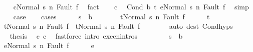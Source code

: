 \begin{isabellebody}
\ \ \isamarkupfalse%
\ {\isachardoublequoteopen}{\isasymGamma}{\isasymturnstile}{\isasymlangle}c{\isacharcomma}Normal\ s{\isasymrangle}\ {\isacharequal}n{\isasymRightarrow}\ Fault\ f{\isachardoublequoteclose}\ \isamarkupfalse%
\ fact\isanewline
\ \ \isamarkupfalse%
\ c\ \isamarkupfalse%
\ {\isachardoublequoteopen}{\isasymGamma}{\isasymturnstile}{\isasymlangle}Cond\ b\ t\ e{\isacharcomma}Normal\ s{\isasymrangle}\ {\isacharequal}n{\isasymRightarrow}\ Fault\ f{\isachardoublequoteclose}\ \isamarkupfalse%
\ simp\isanewline
\ \ \isamarkupfalse%
\ {\isacharquery}case\isanewline
\ \ \isamarkupfalse%
\ {\isacharparenleft}cases{\isacharparenright}\isanewline
\ \ \ \ \isamarkupfalse%
\ {\isachardoublequoteopen}s\ {\isasymin}\ b{\isachardoublequoteclose}\isanewline
\ \ \ \ \isamarkupfalse%
\ \isamarkupfalse%
\ {\isachardoublequoteopen}{\isasymGamma}{\isasymturnstile}{\isasymlangle}t{\isacharcomma}Normal\ s{\isasymrangle}\ {\isacharequal}n{\isasymRightarrow}\ Fault\ f{\isachardoublequoteclose}\isanewline
\ \ \ \ \isamarkupfalse%
\ t\ \isamarkupfalse%
\ {\isachardoublequoteopen}{\isasymGamma}{\isasymturnstile}{\isasymlangle}t{}{\isacharcomma}Normal\ s{\isasymrangle}\ {\isacharequal}n{\isasymRightarrow}\ Fault\ f\ {\isasymor}\ {\isasymGamma}{\isasymturnstile}{\isasymlangle}t{}{\isacharcomma}Normal\ s{\isasymrangle}\ {\isacharequal}n{\isasymRightarrow}\ Fault\ f{\isachardoublequoteclose}\isanewline
\ \ \ \ \ \ \isamarkupfalse%
\ {\isacharparenleft}auto\ dest{\isacharcolon}\ Cond{\isachardot}hyps{\isacharparenright}\isanewline
\ \ \ \ \isamarkupfalse%
\ \isamarkupfalse%
\ {\isacharquery}thesis\ \isamarkupfalse%
\ c{}\ c\ \isamarkupfalse%
\ {\isacharparenleft}fastforce\ intro{\isacharcolon}\ execn{\isachardot}intros{\isacharparenright}\isanewline
\ \ \isamarkupfalse%
\isanewline
\ \ \ \ \isamarkupfalse%
\ {\isachardoublequoteopen}s\ {\isasymnotin}\ b{\isachardoublequoteclose}\isanewline
\ \ \ \ \isamarkupfalse%
\ \isamarkupfalse%
\ {\isachardoublequoteopen}{\isasymGamma}{\isasymturnstile}{\isasymlangle}e{\isacharcomma}Normal\ s{\isasymrangle}\ {\isacharequal}n{\isasymRightarrow}\ Fault\ f{\isachardoublequoteclose}\isanewline
\ \ \ \ \isamarkupfalse%
\ e\ \isamarkupfalse%

\end{isabellebody}
